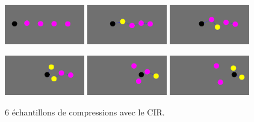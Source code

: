 \documentclass{beamer}
\begin{document}
\begin{frame}
  \begin{figure}
    \begin{center}
      \includegraphics[width=3.5cm]{Images/cir_1.png}
      \includegraphics[width=3.5cm]{Images/cir_2.png}
      \includegraphics[width=3.5cm]{Images/cir_3.png}
    \end{center}
    \begin{center}
      \includegraphics[width=3.5cm]{Images/cir_4.png}
      \includegraphics[width=3.5cm]{Images/cir_5.png}
      \includegraphics[width=3.5cm]{Images/cir_6.png}
    \end{center}
    \caption{6 échantillons de compressions avec le CIR.}
  \end{figure}
\end{frame}
\end{document}
